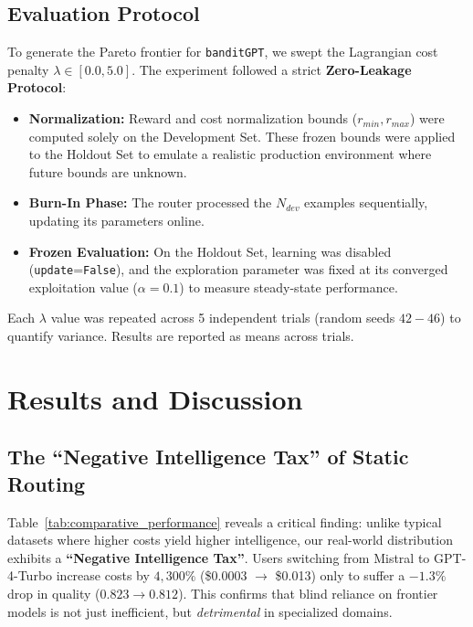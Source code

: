 \subsection{Evaluation Protocol}

To generate the Pareto frontier for \texttt{banditGPT}, we swept the Lagrangian cost penalty $\lambda \in [0.0, 5.0]$. The experiment followed a strict \textbf{Zero-Leakage Protocol}:

\begin{itemize}
    \item \textbf{Normalization:} Reward and cost normalization bounds ($r_{min}, r_{max}$) were computed solely on the Development Set. These frozen bounds were applied to the Holdout Set to emulate a realistic production environment where future bounds are unknown.
    
    \item \textbf{Burn-In Phase:} The router processed the $N_{dev}$ examples sequentially, updating its parameters online.
    
    \item \textbf{Frozen Evaluation:} On the Holdout Set, learning was disabled (\texttt{update}=\texttt{False}), and the exploration parameter was fixed at its converged exploitation value ($\alpha=0.1$) to measure steady-state performance.
\end{itemize}

Each $\lambda$ value was repeated across 5 independent trials (random seeds $42{-}46$) to quantify variance. Results are reported as means across trials.

\section{Results and Discussion}

\subsection{The ``Negative Intelligence Tax'' of Static Routing}

Table~\ref{tab:comparative_performance} reveals a critical finding: unlike typical datasets where higher costs yield higher intelligence, our real-world distribution exhibits a \textbf{``Negative Intelligence Tax''}. Users switching from Mistral to GPT-4-Turbo increase costs by $4,300\%$ (\$0.0003 $\to$ \$0.013) only to suffer a $-1.3\%$ drop in quality ($0.823 \to 0.812$). This confirms that blind reliance on frontier models is not just inefficient, but \textit{detrimental} in specialized domains.

